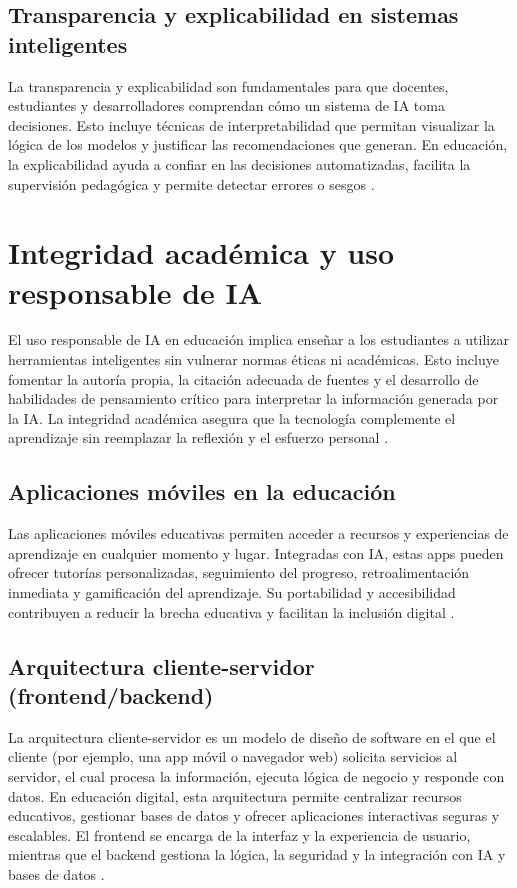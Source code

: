 \subsection{Transparencia y explicabilidad en sistemas inteligentes}
La transparencia y explicabilidad son fundamentales para que docentes,
estudiantes y desarrolladores comprendan cómo un sistema de IA toma decisiones.
Esto incluye técnicas de interpretabilidad que permitan visualizar la lógica de
los modelos y justificar las recomendaciones que generan. En educación, la
explicabilidad ayuda a confiar en las decisiones automatizadas, facilita la
supervisión pedagógica y permite detectar errores o sesgos
\cite{doshi2017towards, lipton2018mythos}.

\section{Integridad académica y uso responsable de IA}
El uso responsable de IA en educación implica enseñar a los estudiantes a
utilizar herramientas inteligentes sin vulnerar normas éticas ni académicas.
Esto incluye fomentar la autoría propia, la citación adecuada de fuentes y el
desarrollo de habilidades de pensamiento crítico para interpretar la
información generada por la IA. La integridad académica asegura que la
tecnología complemente el aprendizaje sin reemplazar la reflexión y el esfuerzo
personal \cite{bretag2016contract, stern2019integrity}.

\subsection{Aplicaciones móviles en la educación}
Las aplicaciones móviles educativas permiten acceder a recursos y experiencias
de aprendizaje en cualquier momento y lugar. Integradas con IA, estas apps
pueden ofrecer tutorías personalizadas, seguimiento del progreso,
retroalimentación inmediata y gamificación del aprendizaje. Su portabilidad y
accesibilidad contribuyen a reducir la brecha educativa y facilitan la
inclusión digital \cite{traxler2009learning, shen2018mobile}.

\subsection{Arquitectura cliente-servidor (frontend/backend)}
La arquitectura cliente-servidor es un modelo de diseño de software en el que
el cliente (por ejemplo, una app móvil o navegador web) solicita servicios al
servidor, el cual procesa la información, ejecuta lógica de negocio y responde
con datos. En educación digital, esta arquitectura permite centralizar recursos
educativos, gestionar bases de datos y ofrecer aplicaciones interactivas
seguras y escalables. El frontend se encarga de la interfaz y la experiencia de
usuario, mientras que el backend gestiona la lógica, la seguridad y la
integración con IA y bases de datos \cite{tanenbaum2007distributed,
    hwang2011cloud}.

